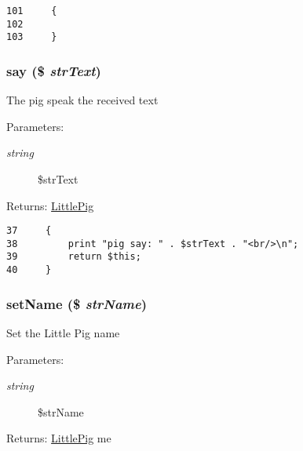\begin{Code}\begin{verbatim}101     {
102 
103     }
\end{verbatim}
\end{Code}


\hypertarget{class_little_pig_0d2d86aa9b7de45757e2d29384b1e549}{
\subsubsection[{say}]{\setlength{\rightskip}{0pt plus 5cm}say (\$ {\em strText})}}
\label{class_little_pig_0d2d86aa9b7de45757e2d29384b1e549}


The pig speak the received text

\begin{Desc}
\item[Parameters:]
\begin{description}
\item[{\em string}]\$strText \end{description}
\end{Desc}
\begin{Desc}
\item[Returns:]\hyperlink{class_little_pig}{LittlePig} \end{Desc}


\begin{Code}\begin{verbatim}37     {
38         print "pig say: " . $strText . "<br/>\n";
39         return $this;
40     }
\end{verbatim}
\end{Code}


\hypertarget{class_little_pig_c05d9184d52b7a34210a801767bef213}{
\subsubsection[{setName}]{\setlength{\rightskip}{0pt plus 5cm}setName (\$ {\em strName})}}
\label{class_little_pig_c05d9184d52b7a34210a801767bef213}


Set the Little Pig name

\begin{Desc}
\item[Parameters:]
\begin{description}
\item[{\em string}]\$strName \end{description}
\end{Desc}
\begin{Desc}
\item[Returns:]\hyperlink{class_little_pig}{LittlePig} me \end{Desc}


